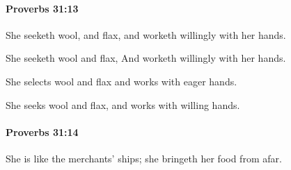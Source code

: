 		\paragraph{Proverbs 31:13} %
			\label{PROVERBS-31-13}

			She seeketh wool, and flax, and worketh willingly with her hands.

			\begin{versebox}
					\item[BHS] 
					\item[ASV] She seeketh wool and flax, And worketh willingly with her hands.
					\item[NIV] She selects wool and flax and works with eager hands.
					\item[NRSV] She seeks wool and flax, and works with willing hands.
			\end{versebox}

		\paragraph{Proverbs 31:14} %
			\label{PROVERBS-31-14}

			She is like the merchants’ ships; she bringeth her food from afar.

